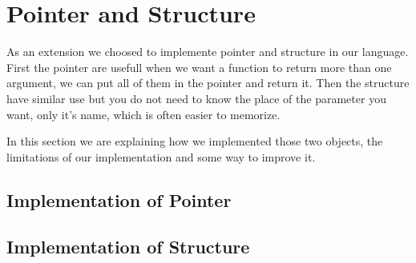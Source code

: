 \documentclass{article}
\begin{document}
\section{Pointer and Structure}
As an extension we choosed to implemente pointer and structure in our language. First the pointer are usefull
when we want a function to return more than one argument, we can put all of them in the pointer and return it.
Then the structure have similar use but you do not need to know the place of the parameter you want, only it's name, which is
often easier to memorize.

In this section we are explaining how we implemented those two objects, the limitations of our implementation and
some way to improve it.

\subsection{Implementation of Pointer}
\subsection{Implementation of Structure}
\end{document}
